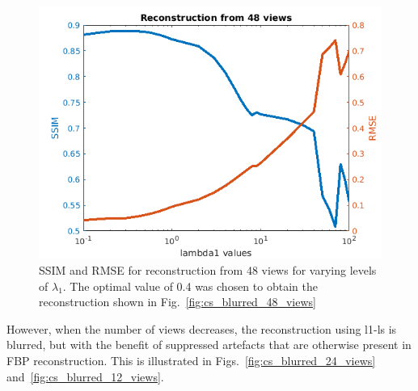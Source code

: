 \documentclass{article}
\begin{document}
\begin{figure}[!h]
\centering
       \includegraphics[width=0.9\columnwidth]{../images/potato/2D/cs_blurred_results/SSIM_RMSE_48_angles.png}
\caption{SSIM and RMSE for reconstruction from 48 views for varying levels of $\lambda_1$. The optimal value of 0.4 was chosen to obtain the reconstruction shown in Fig.~\ref{fig:cs_blurred_48_views}}
\label{fig:ssim_rmse_48_views}
\end{figure}
\newpage

However, when the number of views decreases, the reconstruction using l1-ls is blurred, but with the benefit of suppressed artefacts that are otherwise present in FBP reconstruction. This is illustrated in Figs.~\ref{fig:cs_blurred_24_views} and~\ref{fig:cs_blurred_12_views}.
\end{document}
